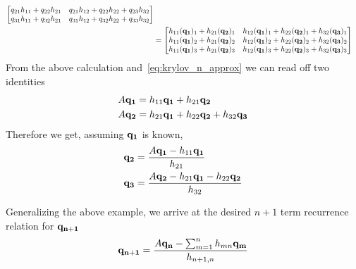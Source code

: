 \begin{example}
\begin{align*}
\begin{bmatrix}
			q_{21}h_{11} + q_{22}h_{21} & q_{21}h_{12} + q_{22}h_{22} + q_{23}h_{32} \\
			q_{31}h_{11} + q_{32}h_{21} & q_{31}h_{12} + q_{32}h_{22}+ q_{33}h_{32}
		\end{bmatrix} \\
		 & =
		\begin{bmatrix}
			h_{11}(\vectorbold{q_1})_1 + h_{21}(\vectorbold{q_2})_1 & h_{12}(\vectorbold{q_1})_1 + h_{22}(\vectorbold{q_2})_1 + h_{32}(\vectorbold{q_3})_1 \\
			h_{11}(\vectorbold{q_1})_2 + h_{21}(\vectorbold{q_2})_2 & h_{12}(\vectorbold{q_1})_2 + h_{22}(\vectorbold{q_2})_2 + h_{32}(\vectorbold{q_3})_2 \\
			h_{11}(\vectorbold{q_1})_3 + h_{21}(\vectorbold{q_2})_3 & h_{12}(\vectorbold{q_1})_3 + h_{22}(\vectorbold{q_2})_3 + h_{32}(\vectorbold{q_3})_3
		\end{bmatrix}
	\end{align*}
	From the above calculation and~\ref{eq:krylov_n_approx} we can read off two identities
	\begin{align*}
		A\vectorbold{q_1} & = h_{11}\vectorbold{q_1}+h_{21}\vectorbold{q_2}                          \\
		A\vectorbold{q_2} & = h_{21}\vectorbold{q_1}+h_{22}\vectorbold{q_2} + h_{32}\vectorbold{q_3}
	\end{align*}
	Therefore we get, assuming \(\vectorbold{q_1}\) is known,
	\begin{align*}
		\vectorbold{q_2} & = \frac{A \vectorbold{q_1} - h_{11} \vectorbold{q_1}}{h_{21}}                          \\
		\vectorbold{q_3} & = \frac{A \vectorbold{q_2} - h_{21} \vectorbold{q_1} - h_{22}\vectorbold{q_2}}{h_{32}}
	\end{align*}
\end{example}
Generalizing the above example, we arrive at the desired \(n+1\) term recurrence relation for \(\vectorbold{q_{n+1}}\)
\begin{equation}
	\vectorbold{q_{n+1}} = \frac{A \vectorbold{q_n} - \sum_{m=1}^{n} h_{mn}\vectorbold{q_m}}{h_{n+1,n}}
	\label{eq:arnoldi_recurrence}
\end{equation}

